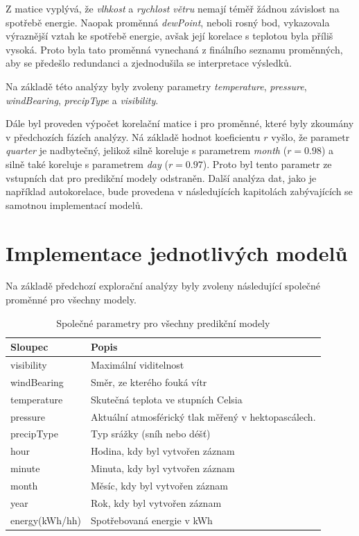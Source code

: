 \documentclass[FM,BP,fonts]{tulthesis}
\begin{document}
Z matice vyplývá, že \textit{vlhkost} a \textit{rychlost větru} nemají téměř žádnou závislost na spotřebě energie. Naopak proměnná \textit{dewPoint}, neboli rosný bod, vykazovala výraznější vztah ke spotřebě energie, avšak její korelace s teplotou byla příliš vysoká. Proto byla tato proměnná vynechaná z finálního seznamu proměnných, aby se předešlo redundanci a zjednodušila se interpretace výsledků.

Na základě této analýzy byly zvoleny parametry \textit{temperature}, \textit{pressure}, \textit{windBearing}, \textit{precipType} a \textit{visibility}.

Dále byl proveden výpočet korelační matice i pro proměnné, které byly zkoumány v předchozích fázích analýzy. Ná základě hodnot koeficientu $r$ vyšlo, že parametr \textit{quarter} je nadbytečný, jelikož silně koreluje s parametrem \textit{month} ($r=0.98$) a silně také koreluje s parametrem \textit{day} ($r=0.97$). Proto byl tento parametr ze vstupních dat pro predikční modely odstraněn. Další analýza dat, jako je například autokorelace, bude provedena v následujících kapitolách zabývajících se samotnou implementací modelů.


\newpage

\section{Implementace jednotlivých modelů}

Na základě předchozí explorační analýzy byly zvoleny následující společné proměnné pro všechny modely. 

\begin{table}[!ht]
	\centering
	\caption{Společné parametry pro všechny predikční modely}
	\label{weather_dataset}
	\begin{tabularx}{\linewidth}{lX}
		\hline
		\textbf{Sloupec} & \textbf{Popis} \\ \hline
		visibility & Maximální viditelnost \\ 
		windBearing & Směr, ze kterého fouká vítr \\ 
		temperature & Skutečná teplota ve stupních Celsia \\ 
		pressure & Aktuální atmosférický tlak měřený v hektopascálech. \\ 
		precipType & Typ srážky (sníh nebo déšť) \\
		hour & Hodina, kdy byl vytvořen záznam \\
		minute & Minuta, kdy byl vytvořen záznam \\
		month & Měsíc, kdy byl vytvořen záznam \\
		year & Rok, kdy byl vytvořen záznam \\
		energy(kWh/hh) & Spotřebovaná energie v kWh \\
		\hline
	\end{tabularx}
\end{table}
\end{document}
